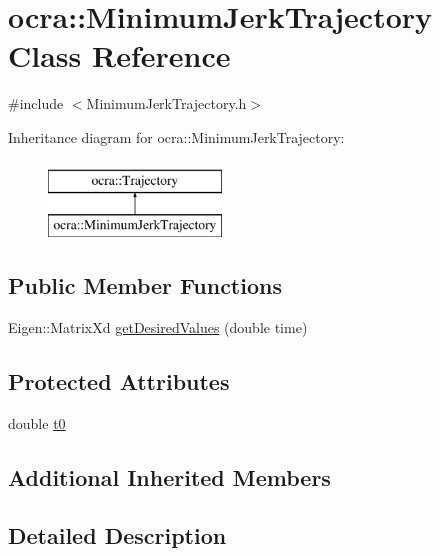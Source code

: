 \hypertarget{classocra_1_1MinimumJerkTrajectory}{}\section{ocra\+:\+:Minimum\+Jerk\+Trajectory Class Reference}
\label{classocra_1_1MinimumJerkTrajectory}


{\ttfamily \#include $<$Minimum\+Jerk\+Trajectory.\+h$>$}

Inheritance diagram for ocra\+:\+:Minimum\+Jerk\+Trajectory\+:\begin{figure}[H]
\begin{center}
\leavevmode
\includegraphics[height=2.000000cm]{d5/df0/classocra_1_1MinimumJerkTrajectory}
\end{center}
\end{figure}
\subsection*{Public Member Functions}
\begin{DoxyCompactItemize}
\item 
Eigen\+::\+Matrix\+Xd \hyperlink{classocra_1_1MinimumJerkTrajectory_aec9a296591707254657082d550bdb21f}{get\+Desired\+Values} (double time)
\end{DoxyCompactItemize}
\subsection*{Protected Attributes}
\begin{DoxyCompactItemize}
\item 
double \hyperlink{classocra_1_1MinimumJerkTrajectory_a59c485dca4c2f2ed0c95809561dfff46}{t0}
\end{DoxyCompactItemize}
\subsection*{Additional Inherited Members}


\subsection{Detailed Description}


